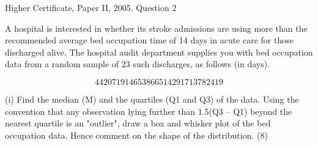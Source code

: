 \documentclass[a4paper,12pt]{article}
\begin{document}
Higher Certificate, Paper II, 2005. Question 2
\begin{framed}
 A hospital is interested in whether its stroke admissions are using more than the recommended average bed occupation time of 14 days in acute care for those discharged alive.  The hospital audit department supplies you with bed occupation data from a random sample of 23 such discharges, as follows (in days). 
 
\[44 20   7 19 14   6   5   3   8   6   6   5   1   4   2   9 17   1   3   7 82   4 19  \]
 
 
(i) Find the median (M) and the quartiles (Q1 and Q3) of the data.  Using the convention that any observation lying further than 1.5(Q3 – Q1) beyond the nearest quartile is an "outlier", draw a box and whisker plot of the bed occupation data.  Hence comment on the shape of the distribution. (8) 
 \end{framed}
 
\end{document}
